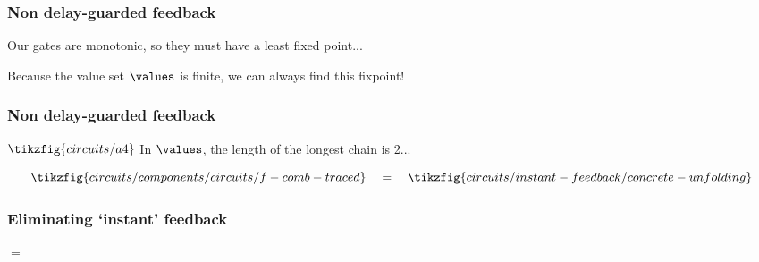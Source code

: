 \begin{frame}
    \frametitle{Non delay-guarded feedback}

    \wait

    Our gates are \alert{monotonic}, so they must have a \alert{least fixed point}...

    \wait

    Because the value set \(\values\) is finite, we can always find this fixpoint!    
    
\end{frame}

\begin{frame}
    \frametitle{Non delay-guarded feedback}

    \(
        \tikzfig{circuits/a4}    
    \)
    \quad
    In \(\values\), the length of the longest chain is \alert{2}...

    \wait

    \[
        \tikzfig{circuits/components/circuits/f-comb-traced}
        \quad=\quad
        \tikzfig{circuits/instant-feedback/concrete-unfolding}
    \]
    

\end{frame}

\begin{frame}
    \frametitle{Eliminating `instant' feedback}

    \begin{center}
        \begin{minipage}{0.25\textwidth}
            \quad\(=\)
        \end{minipage}
    \end{center}
\end{frame}

